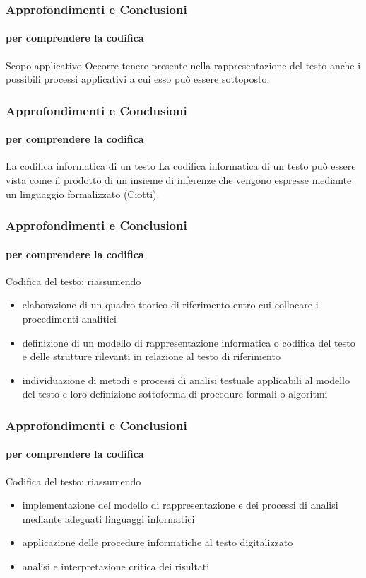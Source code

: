 \begin{frame}
	\frametitle{Approfondimenti e Conclusioni}
	\framesubtitle{per comprendere la codifica}
	\addtocounter{nframe}{1}

	\begin{block}{Scopo applicativo}
		Occorre tenere presente nella rappresentazione del testo anche i possibili processi applicativi a cui esso può essere sottoposto.
	\end{block}

\end{frame}


\begin{frame}
	\frametitle{Approfondimenti e Conclusioni}
	\framesubtitle{per comprendere la codifica}
	\addtocounter{nframe}{1}

	\begin{block}{La codifica informatica di un testo}
		 La codifica informatica di un testo può essere vista come il prodotto di un insieme di inferenze che vengono espresse mediante un linguaggio formalizzato (Ciotti).
	\end{block}

\end{frame}

\begin{frame}
	\frametitle{Approfondimenti e Conclusioni}
	\framesubtitle{per comprendere la codifica}
	\addtocounter{nframe}{1}

	\begin{block}{Codifica del testo: riassumendo}
		\begin{itemize}
			\item elaborazione di un quadro teorico di riferimento entro cui collocare i procedimenti analitici
			\item definizione di un modello di rappresentazione informatica o codifica del testo e delle strutture rilevanti in relazione al testo di riferimento
			\item individuazione di metodi e processi di analisi testuale applicabili al modello del testo e loro definizione sottoforma di procedure formali o algoritmi
		\end{itemize}
	\end{block}

\end{frame}

\begin{frame}
	\frametitle{Approfondimenti e Conclusioni}
	\framesubtitle{per comprendere la codifica}
	\addtocounter{nframe}{1}

	\begin{block}{Codifica del testo: riassumendo}
		\begin{itemize}
			\item implementazione del modello di rappresentazione e dei processi di analisi mediante adeguati linguaggi informatici
			\item applicazione delle procedure informatiche al testo digitalizzato
			\item analisi e interpretazione critica dei risultati
		\end{itemize}
	\end{block}

\end{frame}

